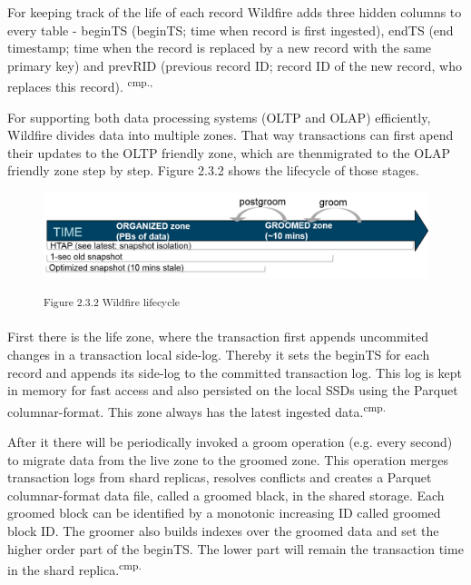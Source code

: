 For keeping track of the life of each record Wildfire adds three hidden columns to every table - \acs{beginTS} (\acl{beginTS}; time when record is first ingested), \acs{endTS} (end timestamp; time when the record is replaced by a new record with the same primary key) and \acs{prevRID} (previous record ID; record ID of the new record, who replaces this record). \textsuperscript{cmp.\cite{29}, \cite{30}}

For supporting both data processing systems (OLTP and OLAP) efficiently, Wildfire divides data into multiple zones. That way transactions can first apend their updates to the OLTP friendly zone, which are thenmigrated to the OLAP friendly zone step by step. Figure 2.3.2 shows the lifecycle of those stages.

\begin{figure}[h]
\centering
\includegraphics[width=\textwidth]{images/wildfire_lifecycle.png}

\textsuperscript{Figure 2.3.2 Wildfire lifecycle}
\end{figure}

First there is the life zone, where the transaction first appends uncommited changes in a transaction local side-log. Thereby it sets the beginTS for each record and appends its side-log to the committed transaction log. This log is kept in memory for fast access and also persisted on the local SSDs using the Parquet columnar-format. This zone always has the latest ingested data.\textsuperscript{cmp.\cite{30}}

After it there will be periodically invoked a groom operation (e.g. every second) to migrate data from the live zone to the groomed zone. This operation merges transaction logs from shard replicas, resolves conflicts and creates a Parquet columnar-format data file, called a groomed black, in the shared storage. Each groomed block can be identified by a monotonic increasing ID called groomed block ID. The groomer also builds indexes over the groomed data and set the higher order part of the beginTS. The lower part will remain the transaction time in the shard replica.\textsuperscript{cmp.\cite{30}}

